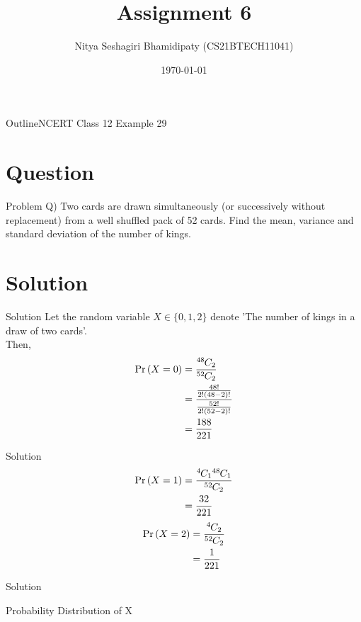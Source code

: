 \documentclass{beamer}
\title{Assignment 6}
\author{Nitya Seshagiri Bhamidipaty (CS21BTECH11041)}
\date{\today}
\providecommand{\pr}[1]{\ensuremath{\Pr\left(#1\right)}}
\newcommand*{\permcomb}[4][0mu]{{{}^{#3}\mkern#1#2_{#4}}}
\newcommand*{\comb}[1][-1mu]{\permcomb[#1]{C}}
\begin{document}
\begin{frame}
    \titlepage 
\end{frame}
\logo{}
\begin{frame}{Outline}{NCERT Class 12 Example 29}
    \tableofcontents
\end{frame}
\section{Question}
\begin{frame}{Problem}
Q) Two cards are drawn simultaneously (or successively without replacement) from a well shuffled pack of 52 cards. Find the mean, variance and standard deviation of the number of kings.
\end{frame}
\section{Solution}
\begin{frame}{Solution}
    Let the random variable $X \in\{0,1,2\}$ denote 'The number of kings in a draw of two cards'.\\
    Then,
    \begin{align}
        \pr{X = 0} &= \frac{\comb{48}{2}}{\comb{52}{2}} \\
        &= \frac{\frac{48!}{2!(48-2)!}}{\frac{52!}{2!(52-2)!}}\\
        &= \frac{188}{221}
    \end{align}
    \end{frame}
\begin{frame}{Solution}
    \begin{align}
        \pr{X = 1} &= \frac{\comb{4}{1}\comb{48}{1}}{\comb{52}{2}}\\
                    &= \frac{32}{221}
    \end{align}
    \begin{align}
        \pr{X = 2} &= \frac{\comb{4}{2}}{\comb{52}{2}}\\
                    &= \frac{1}{221}
    \end{align}
\end{frame}

\begin{frame}{Solution}
    \begin{table}[h!]
        \centering
        
        \caption{Probability Distribution of X}
        \label{tab:table1}
    \end{table}
\end{frame}
\end{document}

